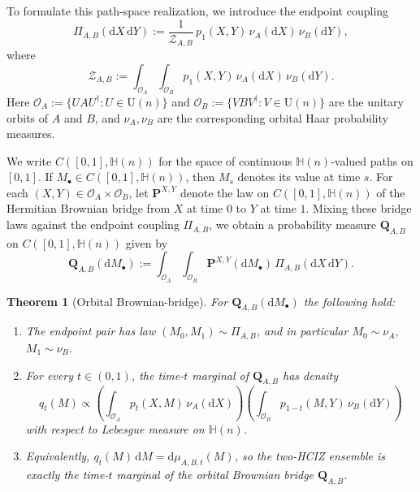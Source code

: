 \documentclass[11pt,a4paper]{article}
\newtheorem{theorem}{Theorem}[section]
\theoremstyle{definition}\newtheorem{definition}[theorem]{Definition}
\theoremstyle{remark}\newtheorem{remark}[theorem]{Remark}
\numberwithin{equation}{section}
\newcommand{\dd}{\mathrm{d}}
\newcommand{\HH}{\mathbb{H}(n)}
\newcommand{\UU}{\mathrm{U}(n)}
\begin{document}
To formulate this path-space realization, we introduce the endpoint coupling
\begin{equation}
\label{eq:endpoint_coupling}
\Pi_{A,B}(\dd X\,\dd Y)
:=
\frac{1}{\mathcal Z_{A,B}}\,
p_1(X,Y)\,\nu_A(\dd X)\,\nu_B(\dd Y),
\end{equation}
where
\begin{equation}
\mathcal Z_{A,B}
:=
\int_{\mathcal O_A}\int_{\mathcal O_B}
p_1(X,Y)\,\nu_A(\dd X)\,\nu_B(\dd Y).
\end{equation}
Here
$\mathcal O_A:=\{UAU^\dagger:U\in\UU\}$ and
$\mathcal O_B:=\{VBV^\dagger:V\in\UU\}$
are the unitary orbits of $A$ and $B$, and
$\nu_A,\nu_B$ are the corresponding orbital Haar probability measures.


We write $C([0,1],\HH)$ for the space of continuous $\HH$-valued paths on $[0,1]$. If $M_\bullet\in C([0,1],\HH)$, then $M_s$ denotes its value at time $s$. For each $(X,Y)\in \mathcal O_A\times\mathcal O_B$, let $\mathbf P^{X,Y}$ denote the law on $C([0,1],\HH)$ of the Hermitian Brownian bridge from $X$ at time $0$ to $Y$ at time $1$. Mixing these bridge laws against the endpoint coupling $\Pi_{A,B}$, we obtain a probability measure $\mathbf Q_{A,B}$ on $C([0,1],\HH)$ given by
\begin{equation}
\mathbf Q_{A,B}(\dd M_\bullet)
:=
\int_{\mathcal O_A}\int_{\mathcal O_B}
\mathbf P^{X,Y}(\dd M_\bullet)\,
\Pi_{A,B}(\dd X\,\dd Y).
\end{equation}

\begin{theorem}[Orbital Brownian-bridge]
\label{thm:orbital_bridge_lift}
For $\mathbf Q_{A,B}(\dd M_\bullet)$ the following hold:
\begin{enumerate}
\item The endpoint pair has law $(M_0,M_1)\sim \Pi_{A,B}$,
and in particular $M_0\sim \nu_A$, $M_1\sim \nu_B$.
 

\item For every $t\in(0,1)$, the time-$t$ marginal of $\mathbf Q_{A,B}$ has
density
\begin{equation}
\label{eq:bridge_marginal_factorized}
q_t(M)\propto
\left(\int_{\mathcal O_A} p_t(X,M)\,\nu_A(\dd X)\right)
\left(\int_{\mathcal O_B} p_{1-t}(M,Y)\,\nu_B(\dd Y)\right)
\end{equation}
with respect to Lebesgue measure on $\HH$.

\item Equivalently, $  q_t(M) \,\dd M=
\dd\mu_{A,B,t}(M)$,
so the two-HCIZ ensemble is exactly the
time-$t$ marginal of the orbital Brownian bridge $\mathbf Q_{A,B}$.
\end{enumerate}
\end{theorem}
\end{document}
